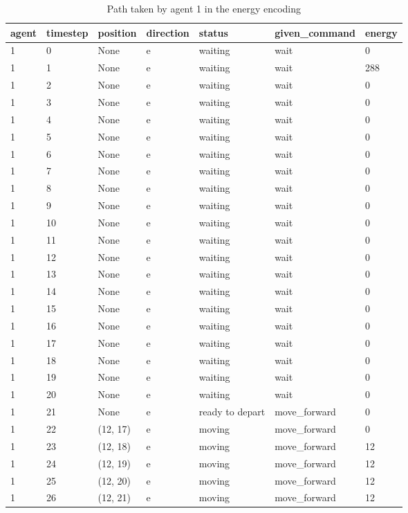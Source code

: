 \begin{table}[H]
  \centering
  \caption{Path taken by agent 1 in the energy encoding}
  \label{tab:energy1}
  \begin{tabular}{lllllll}
    \toprule
    agent & timestep & position & direction & status & given\_command & energy \\
    \midrule
1 & 0 & None & e & waiting & wait & 0 \\
1 & 1 & None & e & waiting & wait & 288 \\
1 & 2 & None & e & waiting & wait & 0 \\
1 & 3 & None & e & waiting & wait & 0 \\
1 & 4 & None & e & waiting & wait & 0 \\
1 & 5 & None & e & waiting & wait & 0 \\
1 & 6 & None & e & waiting & wait & 0 \\
1 & 7 & None & e & waiting & wait & 0 \\
1 & 8 & None & e & waiting & wait & 0 \\
1 & 9 & None & e & waiting & wait & 0 \\
1 & 10 & None & e & waiting & wait & 0 \\
1 & 11 & None & e & waiting & wait & 0 \\
1 & 12 & None & e & waiting & wait & 0 \\
1 & 13 & None & e & waiting & wait & 0 \\
1 & 14 & None & e & waiting & wait & 0 \\
1 & 15 & None & e & waiting & wait & 0 \\
1 & 16 & None & e & waiting & wait & 0 \\
1 & 17 & None & e & waiting & wait & 0 \\
1 & 18 & None & e & waiting & wait & 0 \\
1 & 19 & None & e & waiting & wait & 0 \\
1 & 20 & None & e & waiting & wait & 0 \\
1 & 21 & None & e & ready to depart & move\_forward & 0 \\
1 & 22 & (12, 17) & e & moving & move\_forward & 0 \\
1 & 23 & (12, 18) & e & moving & move\_forward & 12 \\
1 & 24 & (12, 19) & e & moving & move\_forward & 12 \\
1 & 25 & (12, 20) & e & moving & move\_forward & 12 \\
1 & 26 & (12, 21) & e & moving & move\_forward & 12 \\

\end{tabular}
\end{table}
